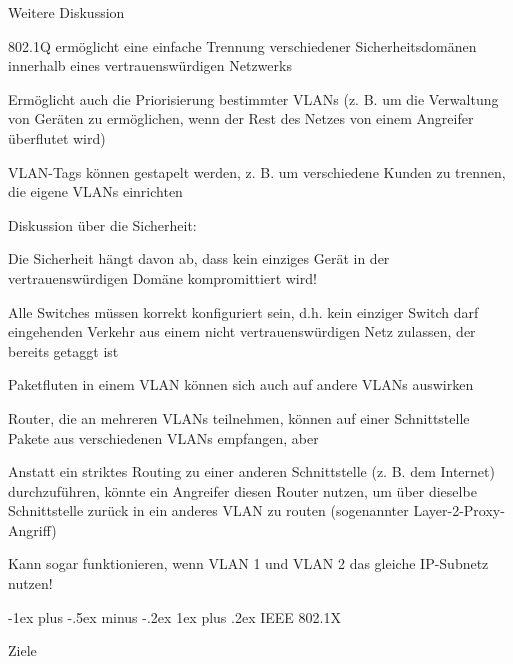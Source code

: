 \documentclass[a4paper]{article}
\makeatletter
\renewcommand{\subsubsection}{\@startsection{subsubsection}{3}{0mm}%
 {-1ex plus -.5ex minus -.2ex}%
 {1ex plus .2ex}%
 {\normalfont\small\bfseries}}
\makeatother
\begin{document}
\begin{multicols}{3}
      Weitere Diskussion

      \begin{itemize*}
            \item 802.1Q ermöglicht eine einfache Trennung verschiedener
            Sicherheitsdomänen innerhalb eines vertrauenswürdigen Netzwerks
            \begin{itemize*}
                  \item Ermöglicht auch die Priorisierung bestimmter VLANs (z. B. um die Verwaltung von Geräten zu ermöglichen, wenn der Rest des Netzes von einem Angreifer überflutet wird)
                  \item VLAN-Tags können gestapelt werden, z. B. um verschiedene Kunden zu trennen, die eigene VLANs einrichten
            \end{itemize*}
            \item Diskussion über die Sicherheit:
            \begin{itemize*}
                  \item Die Sicherheit hängt davon ab, dass kein einziges Gerät in der vertrauenswürdigen Domäne kompromittiert wird!
                  \item Alle Switches müssen korrekt konfiguriert sein, d.h. kein einziger Switch darf eingehenden Verkehr aus einem nicht vertrauenswürdigen Netz zulassen, der bereits getaggt ist
                  \item Paketfluten in einem VLAN können sich auch auf andere VLANs auswirken
                  \item Router, die an mehreren VLANs teilnehmen, können auf einer Schnittstelle Pakete aus verschiedenen VLANs empfangen, aber
                  \item Anstatt ein striktes Routing zu einer anderen Schnittstelle (z. B. dem Internet) durchzuführen, könnte ein Angreifer diesen Router nutzen, um über dieselbe Schnittstelle zurück in ein anderes VLAN zu routen (sogenannter Layer-2-Proxy-Angriff)
                  \item Kann sogar funktionieren, wenn VLAN 1 und VLAN 2 das gleiche IP-Subnetz nutzen!
            \end{itemize*}
      \end{itemize*}


      \subsubsection{IEEE 802.1X}

      Ziele


\end{multicols}
\end{document}
